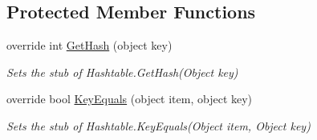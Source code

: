 \subsection*{Protected Member Functions}
\begin{DoxyCompactItemize}
\item 
override int \hyperlink{class_system_1_1_configuration_1_1_fakes_1_1_stub_settings_context_a06dcd148e15db61802d361de654083b0}{Get\-Hash} (object key)
\begin{DoxyCompactList}\small\item\em Sets the stub of Hashtable.\-Get\-Hash(\-Object key)\end{DoxyCompactList}\item 
override bool \hyperlink{class_system_1_1_configuration_1_1_fakes_1_1_stub_settings_context_af6fa5fb721c7cd210236088ee7f67820}{Key\-Equals} (object item, object key)
\begin{DoxyCompactList}\small\item\em Sets the stub of Hashtable.\-Key\-Equals(\-Object item, Object key)\end{DoxyCompactList}\end{DoxyCompactItemize}
